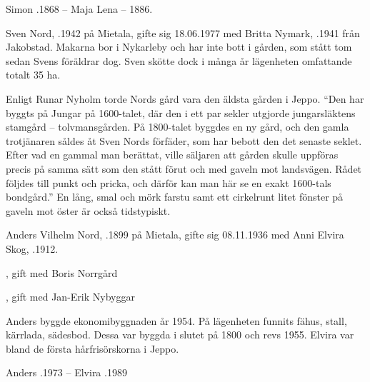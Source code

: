 Simon .1868  --  Maja Lena  – 1886.




Sven Nord, .1942 på Mietala, gifte sig 18.06.1977 med Britta Nymark, .1941 från Jakobstad. Makarna bor i Nykarleby och har inte bott i gården, som stått tom sedan Svens föräldrar dog. Sven skötte dock i många år lägenheten omfattande totalt 35 ha.

Enligt Runar Nyholm torde Nords gård vara den äldsta gården i Jeppo. ``Den har byggts på Jungar på 1600-talet, där den i ett par sekler utgjorde jungarsläktens stamgård – tolvmansgården. På 1800-talet byggdes en ny gård, och den gamla trotjänaren såldes åt Sven Nords förfäder, som har bebott den det senaste seklet. Efter vad en gammal man berättat, ville säljaren att gården skulle uppföras precis på samma sätt som den stått förut och med gaveln mot landsvägen. Rådet följdes till punkt och pricka, och därför kan man här se en exakt 1600-tals bondgård.'' En lång, smal och mörk farstu samt ett cirkelrunt litet fönster på gaveln mot öster är också tidstypiskt.


Anders Vilhelm Nord, .1899 på Mietala, gifte sig 08.11.1936 med Anni Elvira Skog, .1912.
\begin{jhchildren}
  \item {}, gift med Boris Norrgård
  \item {}
  \item {}, gift med Jan-Erik Nybyggar
\end{jhchildren}
Anders byggde ekonomibyggnaden år 1954. På lägenheten funnits fähus, stall, kärrlada, sädesbod. Dessa var byggda i slutet på 1800 och revs 1955. Elvira var bland de första hårfrisörskorna i Jeppo.

Anders .1973  --  Elvira .1989


